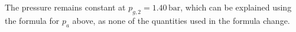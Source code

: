 The pressure remains constant at \( p_{g,2} = 1.40 \, \text{bar} \), which can be explained using the formula for \( p_a \) above, as none of the quantities used in the formula change.